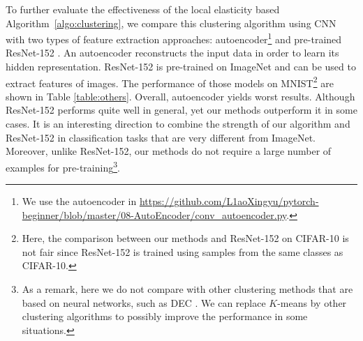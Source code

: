 To further evaluate the effectiveness of the local elasticity based Algorithm~\ref{algo:clustering}, we compare this clustering algorithm using CNN with two types of feature extraction approaches: autoencoder\footnote{We use the autoencoder in \url{https://github.com/L1aoXingyu/pytorch-beginner/blob/master/08-AutoEncoder/conv_autoencoder.py}.} and pre-trained ResNet-152 \citep{he2016deep}. An autoencoder reconstructs the input data in order to learn its hidden representation. ResNet-152 is pre-trained on ImageNet \citep{deng2009imagenet} and can be used to extract features of images. The performance of those models on MNIST\footnote{Here, the comparison between our methods and ResNet-152 on CIFAR-10 is not fair since ResNet-152 is trained using samples from the same classes as CIFAR-10.} are shown in Table \ref{table:others}. Overall, autoencoder yields worst results. Although ResNet-152 performs quite well in general, yet our methods outperform it in some cases. It is an interesting
direction to combine the strength of our algorithm and ResNet-152 in classification tasks that are very different from ImageNet. Moreover, unlike ResNet-152, our methods do not require a large number of examples for pre-training\footnote{As a remark, here we do not compare with other clustering methods that are based on neural networks, such as DEC \citep{xie2016unsupervised}. We can replace $K$-means by other clustering algorithms to possibly improve the performance in some situations.}.
\begin{table}[t]
\centering
{}
\caption{Comparison of different architectures for the local elasticity based clustering algorithm. We only consider the $\ell_2$ loss on MNIST here for the sake of simplicity. 
}
\label{table:architectures}
\end{table}
